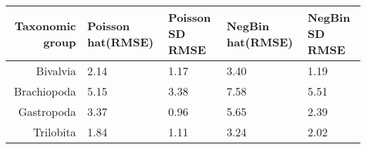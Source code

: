 \begin{table}[ht]
\centering
\begin{tabular}{r|llll}
  \hline
Taxonomic group & Poisson hat(RMSE) & Poisson SD RMSE & NegBin hat(RMSE) & NegBin SD RMSE \\ 
  \hline
Bivalvia & 2.14 & 1.17 & 3.40 & 1.19 \\ 
  Brachiopoda & 5.15 & 3.38 & 7.58 & 5.51 \\ 
  Gastropoda & 3.37 & 0.96 & 5.65 & 2.39 \\ 
  Trilobita & 1.84 & 1.11 & 3.24 & 2.02 \\ 
   \hline
\end{tabular}
\label{tab:test_rmse}
\end{table}
